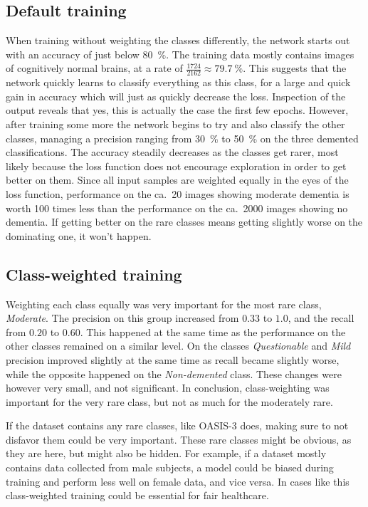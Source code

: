 \documentclass{kththesis}
\newcommand{\num}[1]{{#1}}
\begin{document}
\subsection{Default training}
When training without weighting the classes differently, the network starts out with an accuracy of just below 80~\%. The training data mostly contains images of cognitively normal brains, at a rate of $\frac{1724}{2162} \approx 79.7~\%$. This suggests that the network quickly learns to classify everything as this class, for a large and quick gain in accuracy which will just as quickly decrease the loss. Inspection of the output reveals that yes, this is actually the case the first few epochs. However, after training some more the network begins to try and also classify the other classes, managing a precision ranging from 30~\% to 50~\% on the three demented classifications. The accuracy steadily decreases as the classes get rarer, most likely because the loss function does not encourage exploration in order to get better on them. Since all input samples are weighted equally in the eyes of the loss function, performance on the ca.\ 20 images showing moderate dementia is worth 100 times less than the performance on the ca.\ \num{2000} images showing no dementia. If getting better on the rare classes means getting slightly worse on the dominating one, it won't happen.

\subsection{Class-weighted training}
Weighting each class equally was very important for the most rare class, \textit{Moderate}. The precision on this group increased from $0.33$ to $1.0$, and the recall from $0.20$ to $0.60$. This happened at the same time as the performance on the other classes remained on a similar level. On the classes \textit{Questionable} and \textit{Mild} precision improved slightly at the same time as recall became slightly worse, while the opposite happened on the \textit{Non-demented} class. These changes were however very small, and not significant. In conclusion, class-weighting was important for the very rare class, but not as much for the moderately rare.

If the dataset contains any rare classes, like OASIS-3 does, making sure to not disfavor them could be very important. These rare classes might be obvious, as they are here, but might also be hidden. For example, if a dataset mostly contains data collected from male subjects, a model could be biased during training and perform less well on female data, and vice versa. In cases like this 
class-weighted training could be essential for fair healthcare.
\end{document}
